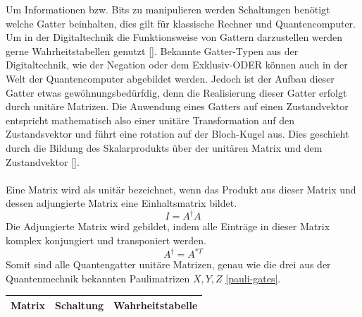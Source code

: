 Um Informationen bzw. Bits zu manipulieren werden Schaltungen ben\"otigt welche Gatter beinhalten, dies gilt f\"ur klassische Rechner und Quantencomputer. Um in der Digitaltechnik die Funktionsweise von Gattern darzustellen werden gerne Wahrheitstabellen genutzt \ref{}. Bekannte Gatter-Typen aus der Digitaltechnik, wie der Negation oder dem Exklusiv-ODER k\"onnen auch in der Welt der Quantencomputer abgebildet werden. Jedoch ist der Aufbau dieser Gatter etwas gew\"ohnungsbed\"urfdig, denn die Realisierung dieser Gatter erfolgt durch unit\"are Matrizen. Die Anwendung eines Gatters auf einen Zustandvektor entspricht mathematisch also einer unit\"are Transformation auf den Zustandsvektor und f\"uhrt eine rotation auf der Bloch-Kugel aus. Dies geschieht durch die Bildung des Skalarprodukts \"uber der unit\"aren Matrix und dem Zustandvektor \ref{}. \\ \\
Eine Matrix wird als unit\"ar bezeichnet, wenn das Produkt aus dieser Matrix und dessen adjungierte Matrix eine Einhaltsmatrix bildet.
\begin{equation}
  I = A^{\dagger} A
\end{equation}
Die Adjungierte Matrix wird gebildet, indem alle Eintr\"age in dieser Matrix komplex konjungiert und transponiert werden.
\begin{equation}
  A^{\dagger} = A^{*T}
\end{equation}
Somit sind alle Quantengatter unit\"are Matrizen, genau wie die drei aus der Quantenmechnik bekannten Paulimatrizen $X, Y, Z$ \ref{pauli-gates}.

\begin{tabular}{ccc}
Matrix & Schaltung & Wahrheitstabelle \\
\hline
\end{tabular}

